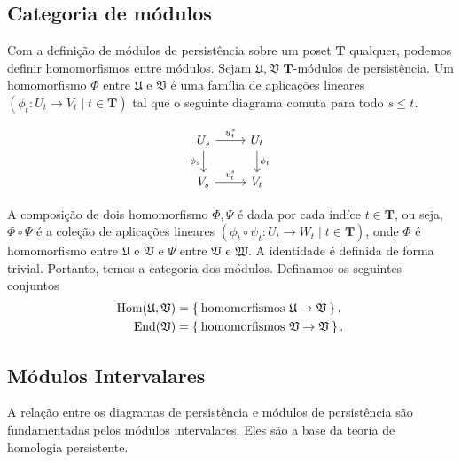 \subsection{Categoria de módulos}
Com a definição de módulos de persistência sobre um poset $\mathbf{T}$ qualquer, podemos definir
homomorfismos entre módulos. Sejam $\mathfrak{U}, \mathfrak{V}$ $\mathbf{T}$-módulos de persistência.
Um homomorfismo $\Phi$ entre $\mathfrak{U}$ e $\mathfrak{V}$ é uma família de aplicações lineares 
$(\phi_t \colon U_t \to V_t \mid t \in \mathbf{T})$ tal que o seguinte diagrama comuta para todo
$s \leq t$. 

\begin{equation*}
    \begin{tikzcd}
        U_s \arrow{d}[swap]{\phi_s} \arrow{r}{u_t^s} & U_t \arrow{d}{\phi_t} \\
        V_s \arrow{r}{v^s_t}                     & V_t                    
    \end{tikzcd} 
\end{equation*}

A composição de dois homomorfismo $\Phi, \Psi$ é dada por cada indíce $t \in \mathbf{T}$, ou seja,
$\Phi \circ \Psi$ é a coleção de aplicações lineares $(\phi_t \circ \psi_t \colon U_t \to W_t \mid t \in \mathbf{T})$,
onde $\Phi$ é homomorfismo entre $\mathfrak{U}$ e $\mathfrak{V}$ e $\Psi$ entre $\mathfrak{V}$ e $\mathfrak{W}$. 
A identidade é definida de forma trivial. Portanto, temos a categoria dos módulos. Definamos os seguintes conjuntos
\begin{align*}
    \text{Hom}(\mathfrak{U}, \mathfrak{V}) &= \Set{\text{homomorfismos } \mathfrak{U} \to \mathfrak{V}}, \\
    \text{End}(\mathfrak{V}) &= \Set{\text{homomorfismos } \mathfrak{V} \to \mathfrak{V}}.
\end{align*}

\subsection{Módulos Intervalares}
A relação entre os diagramas de persistência e módulos de persistência são fundamentadas pelos módulos intervalares. 
Eles são a base da teoria de homologia persistente. 

